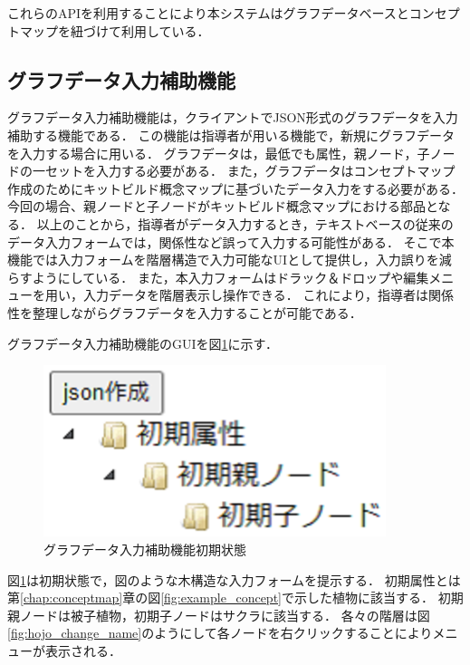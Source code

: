 これらのAPIを利用することにより本システムはグラフデータベースとコンセプトマップを紐づけて利用している．
\newpage

\subsection{グラフデータ入力補助機能}\label{subsec:hojo}
グラフデータ入力補助機能は，クライアントでJSON形式のグラフデータを入力補助する機能である．
この機能は指導者が用いる機能で，新規にグラフデータを入力する場合に用いる．
グラフデータは，最低でも属性，親ノード，子ノードの一セットを入力する必要がある．
また，グラフデータはコンセプトマップ作成のためにキットビルド概念マップに基づいたデータ入力をする必要がある．
今回の場合、親ノードと子ノードがキットビルド概念マップにおける部品となる．
以上のことから，指導者がデータ入力するとき，テキストベースの従来のデータ入力フォームでは，関係性など誤って入力する可能性がある．
そこで本機能では入力フォームを階層構造で入力可能なUIとして提供し，入力誤りを減らすようにしている．
また，本入力フォームはドラック＆ドロップや編集メニューを用い，入力データを階層表示し操作できる．
これにより，指導者は関係性を整理しながらグラフデータを入力することが可能である．

グラフデータ入力補助機能のGUIを図\ref{fig:hojo}に示す．

\begin{figure}[htbp]
\begin{center}
\includegraphics[width=10cm]{img/hojo.eps}
\end{center}
\caption{グラフデータ入力補助機能初期状態}
\label{fig:hojo}
\end{figure}

図\ref{fig:hojo}は初期状態で，図のような木構造な入力フォームを提示する．
初期属性とは第\ref{chap:conceptmap}章の図\ref{fig:example_concept}で示した植物に該当する．
初期親ノードは被子植物，初期子ノードはサクラに該当する．
\newpage
各々の階層は図\ref{fig:hojo_change_name}のようにして各ノードを右クリックすることによりメニューが表示される．

